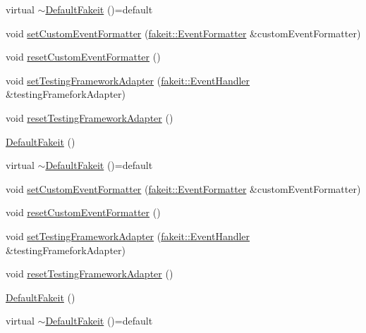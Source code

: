 \begin{DoxyCompactItemize}
virtual \mbox{\hyperlink{classfakeit_1_1DefaultFakeit_a67a996782eb6675b0c0ee0d3b3c9728c}{$\sim$\+Default\+Fakeit}} ()=default
\item 
void \mbox{\hyperlink{classfakeit_1_1DefaultFakeit_acd1e573c131e25862030cec8cf223035}{set\+Custom\+Event\+Formatter}} (\mbox{\hyperlink{structfakeit_1_1EventFormatter}{fakeit\+::\+Event\+Formatter}} \&custom\+Event\+Formatter)
\item 
void \mbox{\hyperlink{classfakeit_1_1DefaultFakeit_a1fe3c5a8670686b732765e6ea1e15b3b}{reset\+Custom\+Event\+Formatter}} ()
\item 
void \mbox{\hyperlink{classfakeit_1_1DefaultFakeit_a7e5375cb58acb0e27a374a32ecf37b5a}{set\+Testing\+Framework\+Adapter}} (\mbox{\hyperlink{structfakeit_1_1EventHandler}{fakeit\+::\+Event\+Handler}} \&testing\+Framefork\+Adapter)
\item 
void \mbox{\hyperlink{classfakeit_1_1DefaultFakeit_a89cf2f8dc0fbfb9e5b18d82eef8fd0c8}{reset\+Testing\+Framework\+Adapter}} ()
\item 
\mbox{\hyperlink{classfakeit_1_1DefaultFakeit_a80d5ef87779c5d3b4e9518ba39e5999f}{Default\+Fakeit}} ()
\item 
virtual \mbox{\hyperlink{classfakeit_1_1DefaultFakeit_a67a996782eb6675b0c0ee0d3b3c9728c}{$\sim$\+Default\+Fakeit}} ()=default
\item 
void \mbox{\hyperlink{classfakeit_1_1DefaultFakeit_acd1e573c131e25862030cec8cf223035}{set\+Custom\+Event\+Formatter}} (\mbox{\hyperlink{structfakeit_1_1EventFormatter}{fakeit\+::\+Event\+Formatter}} \&custom\+Event\+Formatter)
\item 
void \mbox{\hyperlink{classfakeit_1_1DefaultFakeit_a1fe3c5a8670686b732765e6ea1e15b3b}{reset\+Custom\+Event\+Formatter}} ()
\item 
void \mbox{\hyperlink{classfakeit_1_1DefaultFakeit_a7e5375cb58acb0e27a374a32ecf37b5a}{set\+Testing\+Framework\+Adapter}} (\mbox{\hyperlink{structfakeit_1_1EventHandler}{fakeit\+::\+Event\+Handler}} \&testing\+Framefork\+Adapter)
\item 
void \mbox{\hyperlink{classfakeit_1_1DefaultFakeit_a89cf2f8dc0fbfb9e5b18d82eef8fd0c8}{reset\+Testing\+Framework\+Adapter}} ()
\item 
\mbox{\hyperlink{classfakeit_1_1DefaultFakeit_a80d5ef87779c5d3b4e9518ba39e5999f}{Default\+Fakeit}} ()
\item 
virtual \mbox{\hyperlink{classfakeit_1_1DefaultFakeit_a67a996782eb6675b0c0ee0d3b3c9728c}{$\sim$\+Default\+Fakeit}} ()=default
\item 

\end{DoxyCompactItemize}
